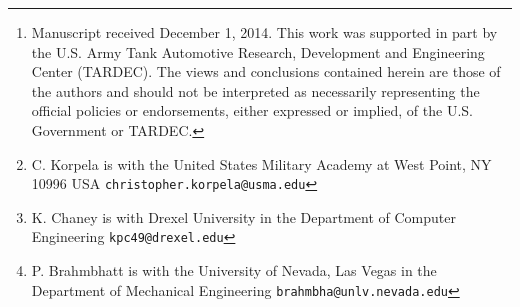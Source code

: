 \author{Christopher Korpela, Kenneth Chaney, and Pareshkumar Brahmbhatt
\thanks{Manuscript received December 1, 2014. This work was supported in part by the U.S. Army Tank Automotive Research, Development and Engineering Center (TARDEC). The views and conclusions contained herein are those of the authors and should not be interpreted as necessarily representing the official policies or endorsements, either expressed or implied, of the U.S. Government or TARDEC.}
\thanks{C. Korpela is with the United States Military Academy at West Point, NY 10996 USA \tt\small{christopher.korpela{@}usma.edu}}
\thanks{K. Chaney is with Drexel University in the Department of Computer Engineering \tt\small{kpc49{@}drexel.edu}}
\thanks{P. Brahmbhatt is with the University of Nevada, Las Vegas in the Department of Mechanical Engineering \tt\small{brahmbha{@}unlv.nevada.edu}}}
